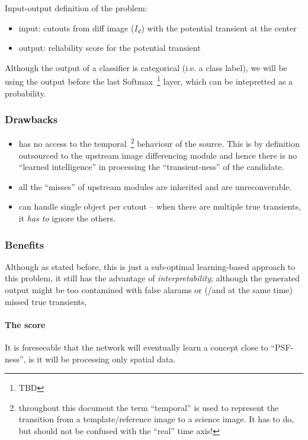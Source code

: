 Input-output definition of the problem:
\begin{itemize}
  \item input: cutouts from diff image ($I_d$) with the potential transient at the center
  \item output: reliability score for the potential transient
\end{itemize}

Although the output of a classifier is categorical (i.e. a class label), we will be using the output before the last Softmax~\footnote{TBD} layer, which can be intepretted as a probability.

\subsubsection{Drawbacks}
\begin{itemize}
\item has no access to the temporal~\footnote{throughout this document the term ``temporal'' is used to represent the transition from a template/reference image to a science image. It has to do, but should not be confused with the ``real'' time axis!} behaviour of the source. This is by definition outsourced to the upstream image differencing module and hence there is no ``learned intelligence'' in processing the ``transient-ness'' of the candidate.
\item all the ``misses'' of upstream modules are inherited and are unreconverable.
\item can handle single object per cutout -- when there are multiple true transients, it \emph{has to} ignore the others.
\end{itemize}

\subsubsection{Benefits}
\label{sec:rb_benefits}

Although as stated before, this is just a sub-optimal learning-based approach to this problem, it still has the advantage of \emph{interpretability}; although the generated output might be too contamined with false alarams or (/and at the same time) missed true transients, 


\paragraph{The score}
It is foreseeable that the network will eventually learn a concept close to ``PSF-ness'', is it will be processing only spatial data.


